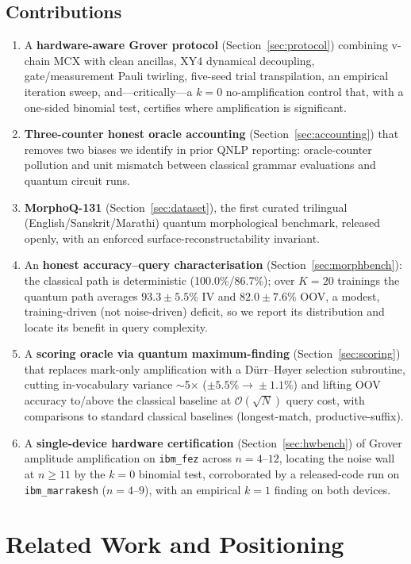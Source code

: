 \documentclass[journal]{IEEEtran}
\newcommand{\bigO}{\mathcal{O}}
\newcommand{\sqrtN}{\sqrt{N}}
\begin{document}
\subsection{Contributions}
\begin{enumerate}
\item A \textbf{hardware-aware Grover protocol} (Section~\ref{sec:protocol})
combining v-chain MCX with clean ancillas, XY4 dynamical decoupling,
gate/measurement Pauli twirling, five-seed trial transpilation, an empirical
iteration sweep, and---critically---a $k{=}0$ no-amplification control that,
with a one-sided binomial test, certifies where amplification is significant.
\item \textbf{Three-counter honest oracle accounting}
(Section~\ref{sec:accounting}) that removes two biases we identify in prior
QNLP reporting: oracle-counter pollution and unit mismatch between classical
grammar evaluations and quantum circuit runs.
\item \textbf{MorphoQ-131} (Section~\ref{sec:dataset}), the first curated
trilingual (English/Sanskrit/Marathi) quantum morphological benchmark, released
openly, with an enforced surface-reconstructability invariant.
\item An \textbf{honest accuracy--query characterisation}
(Section~\ref{sec:morphbench}): the classical path is deterministic
(100.0\%/86.7\%); over $K{=}20$ trainings the quantum path averages
$93.3\pm5.5\%$ IV and $82.0\pm7.6\%$ OOV, a modest, training-driven (not
noise-driven) deficit, so we report its distribution and locate its benefit in
query complexity.
\item A \textbf{scoring oracle via quantum maximum-finding}
(Section~\ref{sec:scoring}) that replaces mark-only amplification with a
D\"urr--H\o yer selection subroutine, cutting in-vocabulary variance
$\sim$5$\times$ ($\pm5.5\%\!\to\!\pm1.1\%$) and lifting OOV accuracy to/above the
classical baseline at $\bigO(\sqrtN)$ query cost, with comparisons to standard
classical baselines (longest-match, productive-suffix).
\item A \textbf{single-device hardware certification}
(Section~\ref{sec:hwbench}) of Grover amplitude amplification on \texttt{ibm\_fez}
across $n{=}4$--$12$, locating the noise wall at $n\!\ge\!11$ by the $k{=}0$
binomial test, corroborated by a released-code run on \texttt{ibm\_marrakesh}
($n{=}4$--$9$), with an empirical $k{=}1$ finding on both devices.
\end{enumerate}

\section{Related Work and Positioning}
\end{document}

